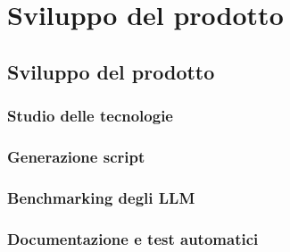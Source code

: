 \chapter{Sviluppo del prodotto}
\label{chap:sviluppo-del-prodotto}
\section{Sviluppo del prodotto}
    \subsection{Studio delle tecnologie}
    \subsection{Generazione script}
    \subsection{Benchmarking degli LLM}
    \subsection{Documentazione e test automatici}
\newpage